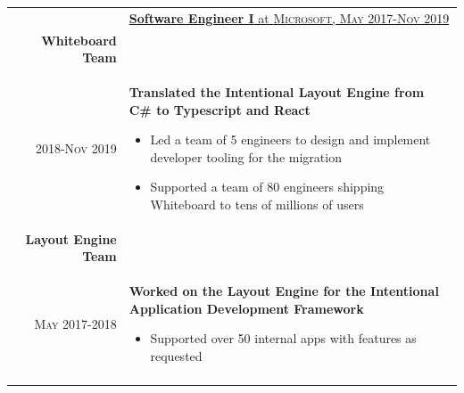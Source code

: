 \documentclass[letterpaper,10pt]{article} %
\newcommand{\work}[4]{\textsc{#1} & \underline{\textbf{#2} at \textsc{#3}}\\ 
\\
& #4\\
\multicolumn{2}{c}{} \\}
\newcommand{\workTwo}[9]{& \underline{\textbf{#2} at \textsc{#3},  \textsc{#1}}\\
\textbf{#4} \\
\textsc{#5} & #6\\
\textbf{#7} \\
\textsc{#8} & #9 \\
\multicolumn{2}{c}{} \\}
\begin{document}
\begin{tabular}{r|p{14.5cm}}
{%


}


\workTwo{May 2017-Nov 2019}{Software Engineer I}{Microsoft}
{ Whiteboard Team }{2018-Nov 2019}{

\textbf{Translated the Intentional Layout Engine from C\# to Typescript and React}
\begin{itemize}
	\item{Led a team of 5 engineers to design and implement developer tooling for the migration}
	\item{Supported a team of 80 engineers shipping Whiteboard to tens of millions of users}
\end{itemize} 

}
{ Layout Engine Team}{May 2017-2018}{
\textbf{Worked on the Layout Engine for the Intentional Application Development Framework}
\begin{itemize}
	\item{Supported over 50 internal apps with features as requested}
\end{itemize}


}

\end{tabular}
\vspace{-7mm} %

\end{document}
